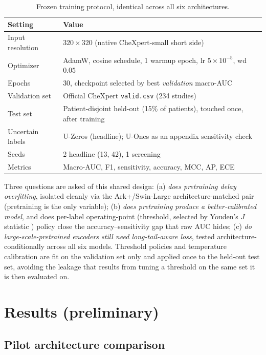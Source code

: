 \documentclass[11pt]{article}
\begin{document}
\begin{table}[h]
\centering
\small
\caption{Frozen training protocol, identical across all six architectures.}
\label{tab:protocol}
\begin{tabular}{@{}ll@{}}
\toprule
Setting & Value \\
\midrule
Input resolution & $320\times320$ (native CheXpert-small short side) \\
Optimizer & AdamW, cosine schedule, 1 warmup epoch, lr $5\times10^{-5}$, wd $0.05$ \\
Epochs & 30, checkpoint selected by best \emph{validation} macro-AUC \\
Validation set & Official CheXpert \texttt{valid.csv} (234 studies) \\
Test set & Patient-disjoint held-out (15\% of patients), touched once, after training \\
Uncertain labels & U-Zeros (headline); U-Ones as an appendix sensitivity check \\
Seeds & 2 headline (13, 42), 1 screening \\
Metrics & Macro-AUC, F1, sensitivity, accuracy, MCC, AP, ECE \\
\bottomrule
\end{tabular}
\end{table}

Three questions are asked of this shared design: (a) \emph{does pretraining delay overfitting}, isolated cleanly via the Ark+/Swin-Large architecture-matched pair (pretraining is the only variable); (b) \emph{does pretraining produce a better-calibrated model}, and does per-label operating-point (threshold, selected by Youden's $J$ statistic \cite{youden1950index}) policy close the accuracy--sensitivity gap that raw AUC hides; (c) \emph{do large-scale-pretrained encoders still need long-tail-aware loss}, tested architecture-conditionally across all six models. Threshold policies and temperature calibration \cite{guo2017calibration} are fit on the validation set only and applied once to the held-out test set, avoiding the leakage that results from tuning a threshold on the same set it is then evaluated on.

\section*{Results (preliminary)}

\subsection*{Pilot architecture comparison}
\end{document}
